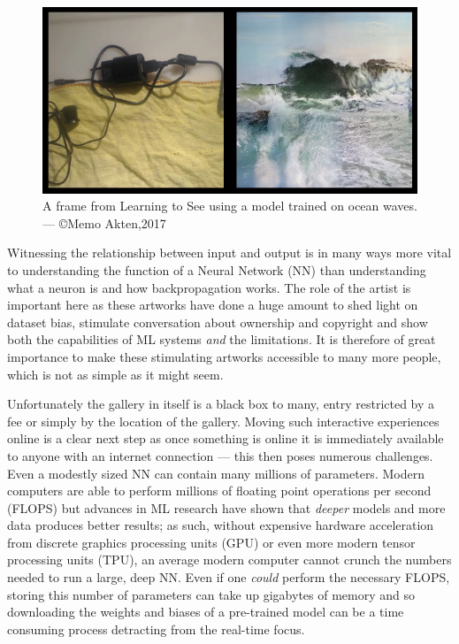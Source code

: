\documentclass{article}
\begin{document}
\begin{figure}[h]
	\centering
	\includegraphics[scale=0.3]{lts_still}
	\caption{A frame from Learning to See using a model trained on ocean waves. --- \copyright Memo Akten,2017}
\end{figure}

Witnessing the relationship between input and output is in many ways more vital to understanding the function of a Neural Network (NN) than understanding what a neuron is and how backpropagation works. The role of the artist is important here as these artworks have done a huge amount to shed light on dataset bias\cite{crawford_paglen_2019}, stimulate conversation about ownership and copyright\cite{romano_2016} and show both the capabilities of ML systems \textit{and} the limitations. It is therefore of great importance to make these stimulating artworks accessible to many more people, which is not as simple as it might seem.

Unfortunately the gallery in itself is a black box to many, entry restricted by a fee or simply by the location of the gallery. Moving such interactive experiences online is a clear next step as once something is online it is immediately available to anyone with an internet connection --- this then poses numerous challenges. Even a modestly sized NN can contain many millions of parameters. Modern computers are able to perform millions of floating point operations per second (FLOPS) but advances in ML research have shown that \textit{deeper} models and more data produces better results\cite{2005.14165}; as such, without expensive hardware acceleration from discrete graphics processing units (GPU) or even more modern tensor processing units (TPU), an average modern computer cannot crunch the numbers needed to run a large, deep NN\@. Even if one \textit{could} perform the necessary FLOPS, storing this number of parameters can take up gigabytes of memory and so downloading the weights and biases of a pre-trained model can be a time consuming process detracting from the real-time focus.
\end{document}
